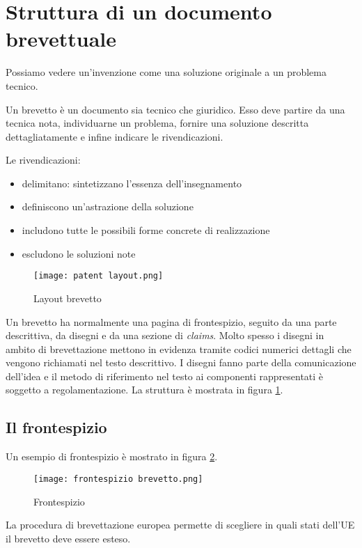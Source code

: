\section{Struttura di un documento brevettuale}

Possiamo vedere un'invenzione come una soluzione originale a un problema tecnico.\bigskip

Un brevetto è un documento sia tecnico che giuridico. Esso deve partire da una tecnica nota, individuarne un problema, fornire una soluzione descritta dettagliatamente e infine indicare le rivendicazioni. 

Le rivendicazioni:
\begin{itemize}
    \item delimitano: sintetizzano l'essenza dell'insegnamento
    \item definiscono un'astrazione della soluzione
    \item includono tutte le possibili forme concrete di realizzazione
    \item escludono le soluzioni note
\end{itemize}

\begin{figure}[h]
    \centering
    \texttt{[image: patent layout.png]}
    \caption{Layout brevetto}
    \label{patent layout}
\end{figure}

Un brevetto ha normalmente una pagina di frontespizio, seguito da una parte descrittiva, da disegni e da una sezione di \textit{claims}. Molto spesso i disegni in ambito di brevettazione mettono in evidenza tramite codici numerici dettagli che vengono richiamati nel testo descrittivo. I disegni fanno parte della comunicazione dell'idea e il metodo di riferimento nel testo ai componenti rappresentati è soggetto a regolamentazione.
La struttura è mostrata in figura \ref{patent layout}.

\subsection{Il frontespizio}
Un esempio di frontespizio è mostrato in figura \ref{frontespizio}.\bigskip

\begin{figure}[!]
    \centering
    \texttt{[image: frontespizio brevetto.png]}
    \caption{Frontespizio}
    \label{frontespizio}
\end{figure}

La procedura di brevettazione europea permette di scegliere in quali stati dell'UE il brevetto deve essere esteso. 

